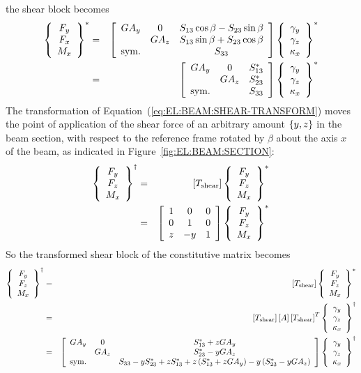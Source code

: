 the shear block becomes
\begin{eqnarray*}
	\cubr{\cvvect{
		F_y \\
		F_x \\
		M_x
	}}^*
	& = &
	\sqbr{\matr{ccc}{
		GA_y & 0 & S_{13}\cos\beta - S_{23}\sin\beta \\
		& GA_z & S_{13}\sin\beta + S_{23}\cos\beta \\
		\llk{sym.} &  & S_{33}
	}}\cubr{\cvvect{
		\gamma_y \\
		\gamma_z \\
		\kappa_x
	}}^*
	\\
	& = &
	\sqbr{\matr{ccc}{
		GA_y & 0 & S_{13}^* \\
		& GA_z & S_{23}^* \\
		\llk{sym.} &  & S_{33}
	}}\cubr{\cvvect{
		\gamma_y \\
		\gamma_z \\
		\kappa_x
	}}^*
\end{eqnarray*}
The transformation of Equation~(\ref{eq:EL:BEAM:SHEAR-TRANSFORM})
moves the point of application of the shear force 
of an arbitrary amount $\cubr{y,z}$ in the beam section,
with respect to the reference frame rotated by $\beta$ about 
the axis $x$ of the beam, as indicated
in Figure~\ref{fig:EL:BEAM:SECTION}:
\begin{eqnarray}
	\cubr{\cvvect{
		F_y \\
		F_z \\
		M_x
	}}^{\dagger}
	& = & \sqbr{T_{\llk{shear}}}\cubr{\cvvect{
		F_y \\
		F_z \\
		M_x
	}}^*
	\nonumber \\
	& = & \sqbr{\matr{ccc}{
		1 &  0 & 0 \\
		0 &  1 & 0 \\
		z & -y & 1
	}}\cubr{\cvvect{
		F_y \\
		F_z \\
		M_x
	}}^*
	\label{eq:EL:BEAM:SHEAR-TRANSFORM}
\end{eqnarray}
So the transformed shear block of the constitutive matrix becomes
\begin{eqnarray}
	\cubr{\cvvect{
		F_y \\
		F_z \\
		M_x
	}}^{\dagger}
	& = & \sqbr{T_{\llk{shear}}}
	\cubr{\cvvect{
		F_y \\
		F_z \\
		M_x
	}}^*
	\nonumber \\
	& = & \sqbr{T_{\llk{shear}}} \sqbr{A} \sqbr{T_{\llk{shear}}}^T
	\cubr{\cvvect{
		\gamma_y \\
		\gamma_z \\
		\kappa_x
	}}^{\dagger}
	\label{eq:EL:BEAM:SHEAR-TRANSFORMED}
	\\
	& = &
	\sqbr{\matr{ccc}{
		GA_y & 0 & S_{13}^* + z GA_y \\
		& GA_z & S_{23}^* - y GA_z \\
		\llk{sym.} &  & S_{33} - y S_{23}^* + z S_{13}^*
		+z\plbr{S_{13}^* + z GA_y} - y\plbr{S_{23}^* - y GA_z}
	}}\cubr{\cvvect{
		\gamma_y \\
		\gamma_z \\
		\kappa_x
	}}^{\dagger}
	\nonumber
\end{eqnarray}
